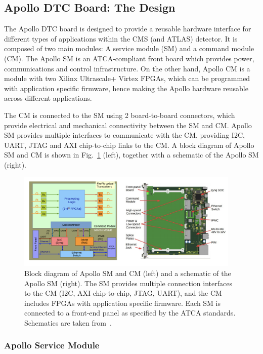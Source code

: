 \subsection{Apollo DTC Board: The Design}

The Apollo DTC board is designed to provide a reusable hardware interface for different types of applications within the
CMS (and ATLAS) detector. It is composed of two main modules: A service module (SM) and a command module (CM).
The Apollo SM is an ATCA-compliant front board which provides power, communications and control infrastructure.
On the other hand, Apollo CM is a module with two Xilinx Ultrascale+ Virtex FPGAs, which can be programmed with
application specific firmware, hence making the Apollo hardware reusable across different applications. 

The CM is connected to the SM using 2 board-to-board connectors, which provide electrical and mechanical 
connectivity between the SM and CM. Apollo SM provides multiple interfaces to communicate with the CM,
providing I2C, UART, JTAG and AXI chip-to-chip links to the CM.
A block diagram of Apollo SM and CM is shown in Fig.~\ref{fig:apollo_schematic} (left), together with
a schematic of the Apollo SM (right).

\begin{figure}[htbp]
    \centering
    \includegraphics[width=0.95\textwidth]{TrackerUpgrade/Apollo/apollo_schematic.png}
    \caption{Block diagram of Apollo SM and CM (left) and a schematic of the Apollo SM (right). The SM provides
    multiple connection interfaces to the CM (I2C, AXI chip-to-chip, JTAG, UART), and the CM includes FPGAs with
    application specific firmware. Each SM is connected to a front-end panel as specified by the ATCA standards. 
    Schematics are taken from~\cite{CMS:ApolloPaper}.}
    \label{fig:apollo_schematic}
\end{figure}

\subsubsection{Apollo Service Module}

